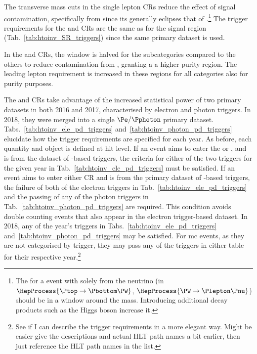 The transverse mass cuts in the single lepton \glspl{CR} reduce the effect of signal contamination, specifically from \ttH since its \mT generally eclipses that of \ttbar.\footnote{The \mT for a \ttbar event with \ptvecmiss solely from the neutrino (in $\HepProcess{\Ptop \to \Pbottom\PW}$, $\HepProcess{\PW \to \Plepton\Pnu}$) should be in a window around the \PW mass. Introducing additional decay products such as the Higgs boson increase it.} The trigger requirements for the \singleMuCr and \doubleMuCr \glspl{CR} are the same as for the signal region (Tab.~\ref{tab:htoinv_SR_triggers}) since the same primary dataset is used.

In the \doubleMuCr and \doubleEleCr \glspl{CR}, the \doubleLepMass window is halved for the \ttH subcategories compared to the others to reduce contamination from \ttbar, granting a a higher purity \ztolplmpjets region. The leading lepton \pt requirement is increased in these regions for all categories also for purity purposes.

The \singleEleCr and \doubleEleCr \glspl{CR} take advantage of the increased statistical power of two primary datasets in both 2016 and 2017, characterised by electron and photon triggers. In 2018, they were merged into a single $\Pe/\Pphoton$ primary dataset. Tabs.~\ref{tab:htoinv_ele_pd_triggers} and~\ref{tab:htoinv_photon_pd_triggers} elucidate how the trigger requirements are specified for each year. As before, each quantity and object is defined at \acrshort{hlt} level. If an event aims to enter the \singleEleCr or \doubleEleCr, and is from the dataset of \Pe-based triggers, the criteria for either of the two triggers for the given year in Tab.~\ref{tab:htoinv_ele_pd_triggers} must be satisfied. If an event aims to enter either \gls{CR} and is from the primary dataset of \Pphoton-based triggers, the failure of both of the electron triggers in Tab.~\ref{tab:htoinv_ele_pd_triggers} and the passing of any of the photon triggers in Tab.~\ref{tab:htoinv_photon_pd_triggers} are required. This condition avoids double counting events that also appear in the electron trigger-based dataset. In 2018, any of the year's triggers in Tabs.~\ref{tab:htoinv_ele_pd_triggers} and~\ref{tab:htoinv_photon_pd_triggers} may be satisfied. For \acrlong{mc} events, as they are not categorised by trigger, they may pass any of the triggers in either table for their respective year.\footnote{See if I can describe the trigger requirements in a more elegant way. Might be easier give the descriptions and actual HLT path names a bit earlier, then just reference the HLT path names in the list.}

